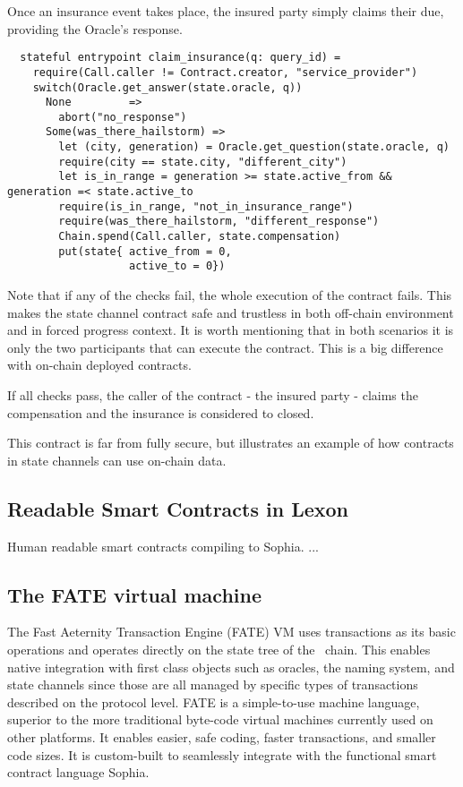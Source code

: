 Once an insurance event takes place, the insured party simply claims their
due, providing the Oracle's response.

\begin{verbatim}
  stateful entrypoint claim_insurance(q: query_id) =
    require(Call.caller != Contract.creator, "service_provider")
    switch(Oracle.get_answer(state.oracle, q))
      None         =>
        abort("no_response")
      Some(was_there_hailstorm) =>
        let (city, generation) = Oracle.get_question(state.oracle, q)
        require(city == state.city, "different_city")
        let is_in_range = generation >= state.active_from && generation =< state.active_to
        require(is_in_range, "not_in_insurance_range")
        require(was_there_hailstorm, "different_response")
        Chain.spend(Call.caller, state.compensation)
        put(state{ active_from = 0,
                   active_to = 0})
\end{verbatim}

Note that if any of the checks fail, the whole execution of the contract
fails. This makes the state channel contract safe and trustless in both
off-chain environment and in forced progress context. It is worth mentioning
that in both scenarios it is only the two participants that can execute the
contract. This is a big difference with on-chain deployed contracts.

If all checks pass, the caller of the contract - the insured party - claims
the compensation and the insurance is considered to closed.

This contract is far from fully secure, but illustrates an example of
how contracts in state channels can use on-chain data.

\subsection{Readable Smart Contracts in Lexon}
Human readable smart contracts compiling to Sophia.
...

\subsection{The FATE virtual machine}
\label{sect:fate}

The Fast Aeternity Transaction Engine (FATE) VM uses transactions as
its basic operations and operates directly on the state tree of the
\aet\ chain. This enables native integration with first class
objects such as oracles, the naming system, and state channels since
those are all managed by specific types of transactions described on
the protocol level. FATE is a simple-to-use machine language, superior
to the more traditional byte-code virtual machines currently used on
other platforms. It enables easier, safe coding, faster transactions,
and smaller code sizes. It is custom-built to seamlessly integrate
with the functional smart contract language Sophia.


